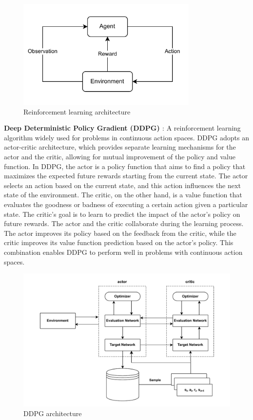 \documentclass[PhD]{PHlab-thesis}
\begin{document}
\begin{figure}[H]
    \centering 
    \includegraphics[width=0.8\textwidth]{images/RL architecture.pdf}
    \caption{Reinforcement learning architecture} 
    \label{Fig.Reinforcement learning architecture} 
\end{figure}

\textbf{Deep Deterministic Policy Gradient (DDPG) \cite{lillicrap2015continuous}}: A reinforcement learning algorithm widely used for problems in continuous action spaces. DDPG adopts an actor-critic architecture, which provides separate learning mechanisms for the actor and the critic, allowing for mutual improvement of the policy and value function. In DDPG, the actor is a policy function that aims to find a policy that maximizes the expected future rewards starting from the current state. The actor selects an action based on the current state, and this action influences the next state of the environment. The critic, on the other hand, is a value function that evaluates the goodness or badness of executing a certain action given a particular state. The critic's goal is to learn to predict the impact of the actor's policy on future rewards. The actor and the critic collaborate during the learning process. The actor improves its policy based on the feedback from the critic, while the critic improves its value function prediction based on the actor's policy. This combination enables DDPG to perform well in problems with continuous action spaces.

\begin{figure}[H]
    \centering 
    \includegraphics[width=\textwidth]{images/DDPG architecture.pdf}
    \caption{DDPG architecture} 
    \label{Fig.DDPG architecture} 
\end{figure}
\end{document}

